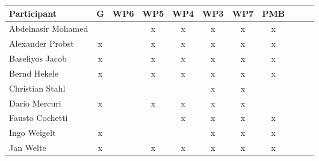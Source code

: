 \documentclass[a4paper, 11pt]{article}
\begin{document}
\begin{tabular}{|l|c|c|c|c||c|c|c||c|c|c|}
\hline
\textbf{Participant}  & \textbf{G} & \textbf{WP6} &  \textbf{WP5} & \textbf{WP4}&  \textbf{WP3} & \textbf{WP7}&  \textbf{PMB} \\\hline
Abdelnasir Mohamed    &  &   & x & x  & x & x & x \\\hline 
Alexander Probst      & x &   & x & x & x & x & x  \\\hline  
Baseliyos Jacob       & x &   & x & x & x & x & x \\\hline 
Bernd Hekele          & x &   & x & x & x & x & x \\\hline
Christian Stahl      &   &   &  &  & x & x  &   \\\hline
Dario Mercuri        & x &   & x & x & x & x &   \\\hline
Fausto Cochetti      &   &   &   & x & x & x & x \\\hline
Ingo Weigelt         & x  &   &  &  & x & x &  x \\\hline
Jan Welte            & x &   & x & x & x & x & x  \\\hline

\end{tabular}
\end{document}
